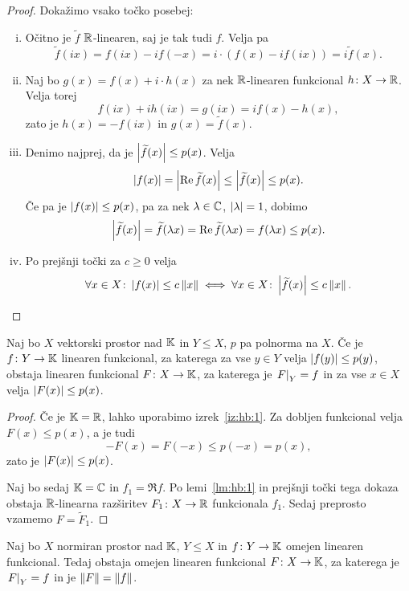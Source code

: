 \begin{proof}
Dokažimo vsako točko posebej:

\begin{enumerate}[i)]
\item Očitno je $\widetilde{f}$ $\mathbb{R}$-linearen, saj je tak tudi $f$.
Velja pa
\[
\widetilde{f}(ix) = f(ix) - if(-x) =
i \cdot (f(x)-if(ix)) = i \widetilde{f}(x).
\]
\item Naj bo $g(x) = f(x) + i \cdot h(x)$ za nek $\mathbb{R}$-linearen
funkcional $h \colon X \to \mathbb{R}$. Velja torej
\[
f(ix) + ih(ix) = g(ix) = if(x) - h(x),
\]
zato je $h(x) = -f(ix)$ in $g(x) = \widetilde{f}(x)$.
\item Denimo najprej, da je $\left\lvert \widetilde{f}(x)\right\rvert \leq p(x)$.
Velja
\[
\left\lvert f(x)\right\rvert = \left\lvert \operatorname{Re} \widetilde{f}(x)\right\rvert \leq
\left\lvert \widetilde{f}(x)\right\rvert \leq p(x).
\]
Če pa je $\left\lvert f(x)\right\rvert \leq p(x)$, pa za nek $\lambda \in \mathbb{C}$,
$\left\lvert \lambda\right\rvert = 1$, dobimo
\[
\left\lvert \widetilde{f}(x)\right\rvert = \widetilde{f}(\lambda x) =
\operatorname{Re} \widetilde{f}(\lambda x) = f(\lambda x) \leq p(x).
\]
\item Po prejšnji točki za $c \geq 0$ velja
\[
\forall x \in X \colon \left\lvert f(x)\right\rvert \leq c \left\lVert x\right\rVert \iff
\forall x \in X \colon \left\lvert \widetilde{f}(x)\right\rvert \leq c \left\lVert x\right\rVert.
\qedhere
\]
\end{enumerate}
\end{proof}

\begin{izrek}
\label{iz:hb:2}
Naj bo $X$ vektorski prostor nad $\mathbb{K}$ in $Y \leq X$, $p$ pa
polnorma na $X$. Če je $f \colon Y \to \mathbb{K}$ linearen funkcional, za
katerega za vse $y \in Y$ velja $\left\lvert f(y)\right\rvert \leq p(y)$, obstaja
linearen funkcional $F \colon X \to \mathbb{K}$, za katerega je
$\left. F\right|_{Y}^{} = f$ in za vse $x \in X$ velja
$\left\lvert F(x)\right\rvert \leq p(x)$.
\end{izrek}

\begin{proof}
Če je $\mathbb{K} = \mathbb{R}$, lahko uporabimo izrek~\ref{iz:hb:1}. Za dobljen
funkcional velja $F(x) \leq p(x)$, a je tudi
\[
-F(x) = F(-x) \leq p(-x) = p(x),
\]
zato je $\left\lvert F(x)\right\rvert \leq p(x)$.

Naj bo sedaj $\mathbb{K} = \mathbb{C}$ in $f_1 = \Re f$. Po lemi~\ref{lm:hb:1} in
prejšnji točki tega dokaza obstaja $\mathbb{R}$-linearna razširitev
$F_1 \colon X \to \mathbb{R}$ funkcionala $f_1$. Sedaj preprosto vzamemo
$F = \widetilde{F}_1$.
\end{proof}

\begin{izrek}
Naj bo $X$ normiran prostor nad $\mathbb{K}$, $Y \leq X$ in
$f \colon Y \to \mathbb{K}$ omejen linearen funkcional. Tedaj obstaja
omejen linearen funkcional $F \colon X \to \mathbb{K}$, za katerega je
$\left. F\right|_{Y}^{} = f$ in je $\left\lVert F\right\rVert = \left\lVert f\right\rVert$.
\end{izrek}

